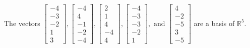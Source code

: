 \begin{exercise}
\begin{exerciseStatement}
  \end{exerciseStatement}
  \begin{exerciseAnswer}
   The vectors \(\left[\begin{array}{r}
-4 \\
-3 \\
-2 \\
1 \\
3
\end{array}\right] , \left[\begin{array}{r}
-4 \\
4 \\
-1 \\
-2 \\
-4
\end{array}\right] , \left[\begin{array}{r}
2 \\
1 \\
4 \\
-4 \\
4
\end{array}\right] , \left[\begin{array}{r}
-4 \\
-3 \\
-3 \\
-2 \\
1
\end{array}\right] , \text{ and } \left[\begin{array}{r}
4 \\
-2 \\
-5 \\
3 \\
-5
\end{array}\right]\) 
  	 are  a basis of \(\mathbb{R}^5\).
  


  \end{exerciseAnswer}
\end{exercise}